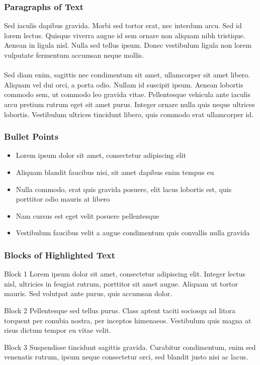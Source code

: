 \documentclass{beamer}
\begin{document}

\begin{frame}

\frametitle{Paragraphs of Text}
Sed iaculis dapibus gravida. Morbi sed tortor erat, nec interdum arcu. Sed id lorem lectus. Quisque viverra augue id sem ornare non aliquam nibh tristique. Aenean in ligula nisl. Nulla sed tellus ipsum. Donec vestibulum ligula non lorem vulputate fermentum accumsan neque mollis.\\~\\

Sed diam enim, sagittis nec condimentum sit amet, ullamcorper sit amet libero. Aliquam vel dui orci, a porta odio. Nullam id suscipit ipsum. Aenean lobortis commodo sem, ut commodo leo gravida vitae. Pellentesque vehicula ante iaculis arcu pretium rutrum eget sit amet purus. Integer ornare nulla quis neque ultrices lobortis. Vestibulum ultrices tincidunt libero, quis commodo erat ullamcorper id.
\end{frame}


\begin{frame}
\frametitle{Bullet Points}
\begin{itemize}
\item Lorem ipsum dolor sit amet, consectetur adipiscing elit
\item Aliquam blandit faucibus nisi, sit amet dapibus enim tempus eu
\item Nulla commodo, erat quis gravida posuere, elit lacus lobortis est, quis porttitor odio mauris at libero
\item Nam cursus est eget velit posuere pellentesque
\item Vestibulum faucibus velit a augue condimentum quis convallis nulla gravida
\end{itemize}
\end{frame}


\begin{frame}
\frametitle{Blocks of Highlighted Text}
\begin{block}{Block 1}
Lorem ipsum dolor sit amet, consectetur adipiscing elit. Integer lectus nisl, ultricies in feugiat rutrum, porttitor sit amet augue. Aliquam ut tortor mauris. Sed volutpat ante purus, quis accumsan dolor.
\end{block}

\begin{block}{Block 2}
Pellentesque sed tellus purus. Class aptent taciti sociosqu ad litora torquent per conubia nostra, per inceptos himenaeos. Vestibulum quis magna at risus dictum tempor eu vitae velit.
\end{block}

\begin{block}{Block 3}
Suspendisse tincidunt sagittis gravida. Curabitur condimentum, enim sed venenatis rutrum, ipsum neque consectetur orci, sed blandit justo nisi ac lacus.
\end{block}
\end{frame}
\end{document}
